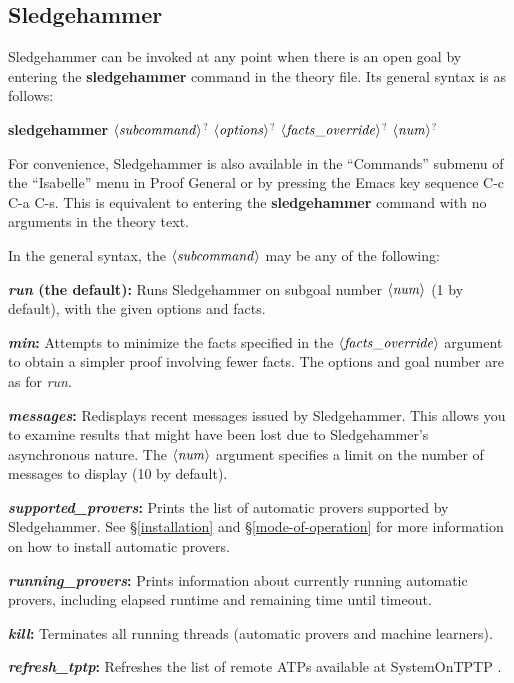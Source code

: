 \documentclass[a4paper,12pt]{article}
\def\qty#1{\ensuremath{\left<\mathit{#1\/}\right>}}
\begin{document}
\subsection{Sledgehammer}

Sledgehammer can be invoked at any point when there is an open goal by entering
the \textbf{sledgehammer} command in the theory file. Its general syntax is as
follows:

\prew
\textbf{sledgehammer} \qty{subcommand}$^?$ \qty{options}$^?$ \qty{facts\_override}$^?$ \qty{num}$^?$
\postw

For convenience, Sledgehammer is also available in the ``Commands'' submenu of
the ``Isabelle'' menu in Proof General or by pressing the Emacs key sequence C-c
C-a C-s. This is equivalent to entering the \textbf{sledgehammer} command with
no arguments in the theory text.

In the general syntax, the \qty{subcommand} may be any of the following:

\begin{enum}
\item[\labelitemi] \textbf{\textit{run} (the default):} Runs Sledgehammer on
subgoal number \qty{num} (1 by default), with the given options and facts.

\item[\labelitemi] \textbf{\textit{min}:} Attempts to minimize the facts
specified in the \qty{facts\_override} argument to obtain a simpler proof
involving fewer facts. The options and goal number are as for \textit{run}.

\item[\labelitemi] \textbf{\textit{messages}:} Redisplays recent messages issued
by Sledgehammer. This allows you to examine results that might have been lost
due to Sledgehammer's asynchronous nature. The \qty{num} argument specifies a
limit on the number of messages to display (10 by default).

\item[\labelitemi] \textbf{\textit{supported\_provers}:} Prints the list of
automatic provers supported by Sledgehammer. See \S\ref{installation} and
\S\ref{mode-of-operation} for more information on how to install automatic
provers.

\item[\labelitemi] \textbf{\textit{running\_provers}:} Prints information about
currently running automatic provers, including elapsed runtime and remaining
time until timeout.

\item[\labelitemi] \textbf{\textit{kill}:} Terminates all running
threads (automatic provers and machine learners).

\item[\labelitemi] \textbf{\textit{refresh\_tptp}:} Refreshes the list of remote
ATPs available at System\-On\-TPTP \cite{sutcliffe-2000}.
\end{enum}
\end{document}
